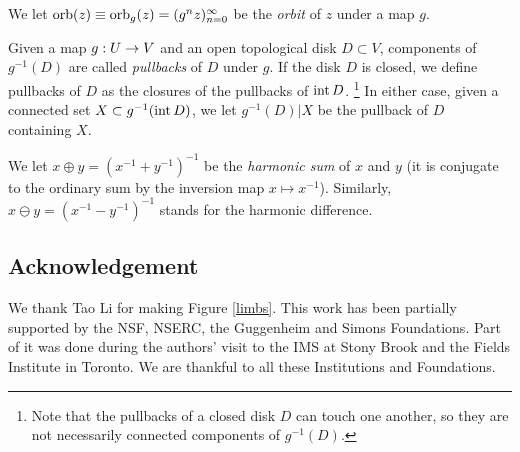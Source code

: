   We let $\operatorname{orb}(z)\equiv \operatorname{orb}_g(z)= (g^n z)_{n=0}^\infty$ be the {\it orbit} of $z$ under a map $g$.

  Given a map $g: U\rightarrow V$ and an open topological disk $D\subset V$,
components of $g^{-1}(D)$ are called {\it pullbacks}  of $D$ under $g$.
If the disk $D$ is closed, we define pullbacks of $D$ as the closures of the pullbacks of $\operatorname{int} D$.%
\footnote{Note that the pullbacks of a closed disk $D$ can touch one another,
so they are not necessarily connected components of $g^{-1}(D)$.}
In either case,
given a connected set $X\subset g^{-1}(\operatorname{int} D)$, we let $g^{-1} (D)|X$ be the pullback of $D$
containing $X$.

We let $ x\oplus y = (x^{-1} + y^{-1})^{-1}$ be the {\it harmonic sum} of $x$ and $y$
(it is conjugate to the ordinary sum by the inversion map $x\mapsto x^{-1}$).
Similarly,  $ x\ominus y = (x^{-1} - y^{-1})^{-1}$ stands for the  harmonic difference.


%

\subsection{Acknowledgement}
  We thank Tao Li for making Figure \ref{limbs}.
This work has been partially supported by the NSF, NSERC, the Guggenheim and  Simons Foundations.
Part of it was done during the authors' visit to the IMS at Stony Brook and the Fields Institute in Toronto.
We are thankful to all these Institutions and Foundations.
